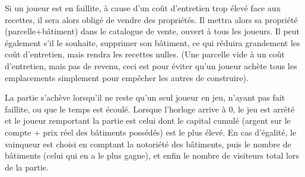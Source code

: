 \documentclass[a4paper,11pt]{report}
\begin{document}
Si un joueur est en faillite, à cause d'un coût d'entretien trop élevé face aux recettes, il sera alors obligé de vendre des propriétés. Il mettra alors sa propriété (parcelle+bâtiment) dans le catalogue de vente, ouvert à tous les joueurs.
Il peut également s'il le souhaite, supprimer son bâtiment, ce qui réduira grandement les coût d'entretien, mais rendra les recettes nulles. (Une parcelle vide à un coût d'entretien, mais pas de revenu, ceci est pour éviter qu'un joueur achète tous les emplacements simplement pour empêcher les autres de construire).

La partie s'achève lorsqu'il ne reste qu'un seul joueur en jeu, n'ayant pas fait faillite, ou que le temps est écoulé. Lorsque l'horloge arrive à 0, le jeu est arrêté et le joueur remportant la partie est celui dont le capital cumulé (argent sur le compte + prix réel des bâtiments possédés) est le plus élevé. En cas d'égalité, le vainqueur est choisi en comptant la notoriété des bâtiments, puis le nombre de bâtiments (celui qui en a le plus gagne), et enfin le nombre de visiteurs total lors de la partie.

\newpage
\end{document}
